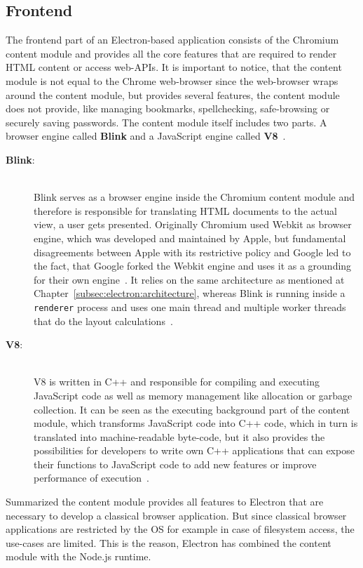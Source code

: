 \subsection{Frontend}
\label{subsec:electron:frontend}
The frontend part of an Electron-based application consists of the Chromium content module and provides all the core features that are required to render \ac{HTML} content
or access web-\ac{API}s.
It is important to notice, that the content module is not equal to the Chrome web-browser since the web-browser wraps around the content module, but provides
several features, the content module does not provide, like managing bookmarks, spellchecking, safe-browsing or securely saving passwords.
The content module itself includes two parts.
A browser engine called \textbf{Blink} and a JavaScript engine called \textbf{V8}~\cite{electron-in-action}.
\begin{description}
    \item[\textbf{Blink}:] \hfill \\ Blink serves as a browser engine inside the Chromium content module and therefore is responsible for translating \ac{HTML} documents to the actual view, a user gets presented.
    Originally Chromium used Webkit as browser engine, which was developed and maintained by Apple, but fundamental disagreements between Apple with its restrictive policy and Google led to the fact,
    that Google forked the Webkit engine and uses it as a grounding for their own engine~\cite{heiseBlink}.
    It relies on the same architecture as mentioned at Chapter~\ref{subsec:electron:architecture}, whereas Blink is running inside a \texttt{renderer} process and uses one main thread
    and multiple worker threads that do the layout calculations~\cite{blinkGoogle}.
    \item [\textbf{V8}:] \hfill \\ V8 is written in C++ and responsible for compiling and executing JavaScript code as well as memory management like allocation or garbage collection.
    It can be seen as the executing background part of the content module, which transforms JavaScript code into C++ code, which in turn is translated into machine-readable byte-code,
    but it also provides the possibilities for developers to write own C++ applications that can expose their functions to JavaScript code to add new features or improve performance of execution~\cite{V8Doc}.

\end{description}
Summarized the content module provides all features to Electron that are necessary to develop a classical browser application.
But since classical browser applications are restricted by the \ac{OS} for example in case of filesystem access, the use-cases are limited.
This is the reason, Electron has combined the content module with the Node.js runtime.

